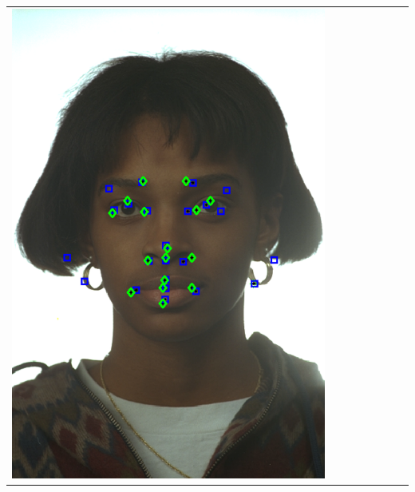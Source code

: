\documentclass[portrait,final,a0paper,fontscale=0.277]{baposter}
\begin{document}
\begin{poster}
{{\begin{tabular}{@{}rccccccc@{}}
\parbox[c]{0.11\linewidth}{\includegraphics[width=\linewidth]{images/l_fa_fail.pdf}} &

\end{tabular}}}
\end{poster}
\end{document}
